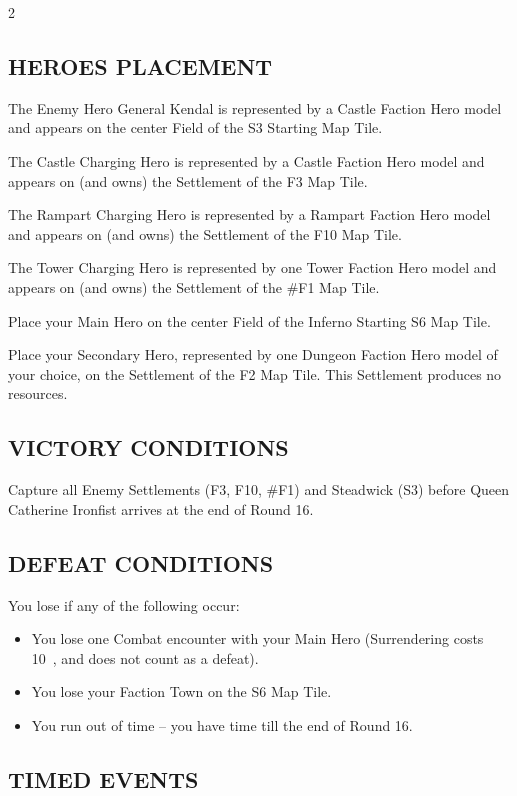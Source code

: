 \begin{multicols*}{2}
\subsection*{\MakeUppercase{Heroes Placement}}

The Enemy Hero General Kendal is represented by a Castle Faction Hero model and appears on the center Field of the S3 Starting Map Tile.

The Castle Charging Hero is represented by a Castle Faction Hero model and appears on (and owns) the Settlement of the F3 Map Tile.

The Rampart Charging Hero is represented by a Rampart Faction Hero model and appears on (and owns) the Settlement of the F10 Map Tile.

The Tower Charging Hero is represented by one Tower Faction Hero model and appears on (and owns) the Settlement of the \#F1 Map Tile.

Place your Main Hero on the center Field of the Inferno Starting S6 Map Tile.

Place your Secondary Hero, represented by one Dungeon Faction Hero model of your choice, on the Settlement of the F2 Map Tile. This Settlement produces no resources.

\subsection*{\MakeUppercase{Victory Conditions}}

Capture all Enemy Settlements (F3, F10, \#F1) and Steadwick (S3) before Queen Catherine Ironfist arrives at the end of Round 16.

\subsection*{\MakeUppercase{Defeat Conditions}}

You lose if any of the following occur:
\begin{itemize}
  \item You lose one Combat encounter with your Main Hero (Surrendering costs 10~, and does not count as a defeat).
  \item You lose your Faction Town on the S6 Map Tile.
  \item You run out of time -- you have time till the end of Round 16.
\end{itemize}

\subsection*{\MakeUppercase{Timed Events}}


\end{multicols*}
